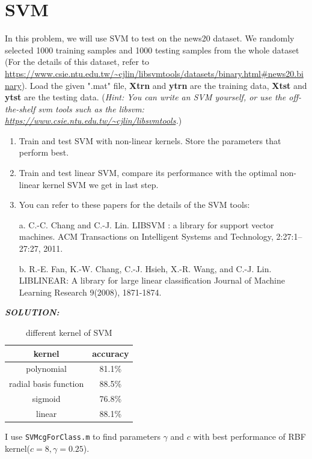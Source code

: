 \documentclass[oneside]{article}
\begin{document}
\section*{SVM}
In this problem, we will use SVM to test on the news20 dataset. We randomly selected 1000 training samples and 1000 testing samples from the whole dataset (For the details of this dataset, refer to \url{https://www.csie.ntu.edu.tw/~cjlin/libsvmtools/datasets/binary.html#news20.binary}). Load the given ".mat" file, \textbf{Xtrn} and \textbf{ytrn} are the training data, \textbf{Xtst} and \textbf{ytst} are the testing data. (\emph{Hint: You can write an SVM yourself, or use the off-the-shelf svm tools such as the libsvm: \url{https://www.csie.ntu.edu.tw/~cjlin/libsvmtools}.})
\begin{enumerate}
\item Train and test SVM with non-linear kernels. Store the parameters that perform best.

\item Train and test linear SVM, compare its performance with the optimal non-linear kernel SVM we get in last step.

\item You can refer to these papers for the details of the SVM tools:

a. C.-C. Chang and C.-J. Lin. LIBSVM : a library for support vector machines. ACM Transactions on Intelligent Systems and Technology, 2:27:1--27:27, 2011.

b. R.-E. Fan, K.-W. Chang, C.-J. Hsieh, X.-R. Wang, and C.-J. Lin. LIBLINEAR: A library for large linear classification Journal of Machine Learning Research 9(2008), 1871-1874.
\end{enumerate}
\emph{\textbf{SOLUTION:}}\\
\begin{table}[!htbp]
\centering
\begin{tabular}{|c|c|}
\hline
 kernel & accuracy  \\
\hline
polynomial & 81.1\%   \\
\hline
radial basis function& 88.5\%\\
\hline
sigmoid & 76.8\% \\
\hline
linear & 88.1\% \\
\hline
\end{tabular}
\caption{different kernel of SVM}
\end{table}
I use \texttt{SVMcgForClass.m} to find parameters $\gamma$ and $c$ with best performance of RBF kernel($c=8,\gamma=0.25$).
\end{document}
